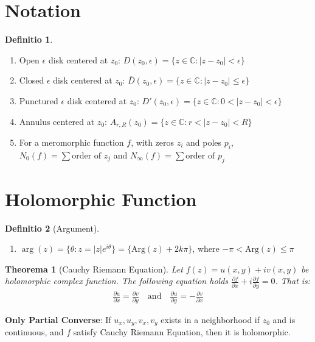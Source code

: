 \documentclass[12pt, a4paper]{article}
\newtheorem{theorem}{Theorema}[section]
\theoremstyle{definition}
\newtheorem{definition}{Definitio}[section]
\theoremstyle{remark}
\newcommand{\bb}[1]{\mathbb{#1}}
\newcommand{\Arg}{\text{Arg}}
\begin{document}
\section{Notation} 
\begin{definition}
	\ 
	\begin{enumerate}
		\item Open $\epsilon$ disk centered at $z_0$: $D(z_0, \epsilon) = \{z \in \bb{C} : |z - z_0| < \epsilon\}$
		\item Closed $\epsilon$ disk centered at $z_0$: $\overline{D}(z_0, \epsilon) = \{z \in \bb{C} : |z - z_0| \leq \epsilon\}$	
		\item Punctured $\epsilon$ disk centered at $z_0$: $D'(z_0, \epsilon) = \{z \in \bb{C} : 0 < |z - z_0| < \epsilon\}$
		\item Annulus centered at $z_0$: $A_{r, R}(z_0) = \{z \in \bb{C} : r < |z - z_0| < R\}$
    \item For a meromorphic function $f$, with zeros $z_i$ and poles $p_i$, $N_0(f) = \sum \text{order of } z_j$ and $N_{\infty} (f) = \sum \text{order of } p_j$
	\end{enumerate}

\end{definition}

\section{Holomorphic Function}

\begin{definition}[Argument]
	\ 
	\begin{enumerate}
		\item $\arg (z) = \{\theta : z = |z| e^{i \theta}\} = \{\Arg(z) + 2k\pi\}$, where $- \pi <\Arg(z) \leq \pi$
	\end{enumerate}
\end{definition}

\begin{theorem}[Cauchy Riemann Equation]
	Let $f(z) = u(x, y) + iv(x, y)$ be holomorphic 
	complex function. The following equation holds $\frac{\partial f}{\partial x} + i\frac{\partial f}{\partial y} =0 $. That is:
	\begin{align*}
		\frac{\partial u}{\partial x} = \frac{\partial v}{\partial y} \quad \text{and} \quad \frac{\partial u}{\partial y} = -\frac{\partial v}{\partial x}
	\end{align*}
\end{theorem}

\textbf{Only Partial Converse}: 
If $u_x, u_y, v_x, v_y$ exists in a neighborhood if $z_0$ and is continuous, and $f$ satisfy Cauchy Riemann Equation, then it is holomorphic.
\end{document}
